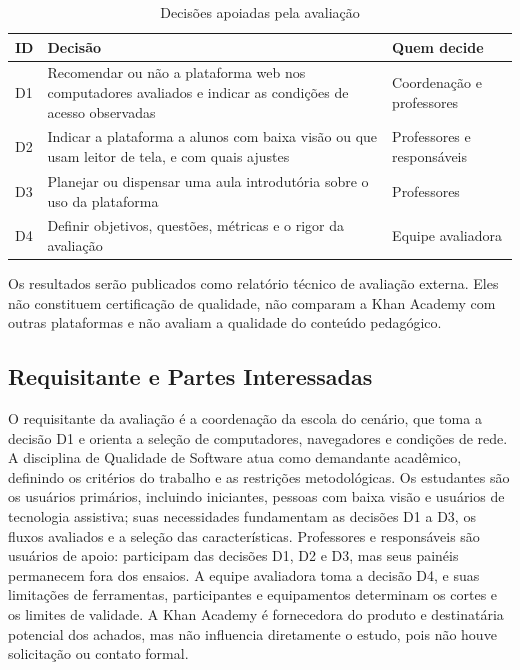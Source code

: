 \documentclass[sigconf, language=english, language=brazilian,natbib=false]{acmart}
\begin{document}
\begin{table}[htbp]
\centering
\caption{Decisões apoiadas pela avaliação}
\label{tab:decisoes}
\scriptsize
\setlength{\tabcolsep}{3pt}
\begin{tabular}{lp{4.3cm}p{2.4cm}}
\hline
\textbf{ID} & \textbf{Decisão} & \textbf{Quem decide} \\
\hline
D1 & Recomendar ou não a plataforma web nos computadores avaliados e indicar as condições de acesso observadas & Coordenação e professores \\
D2 & Indicar a plataforma a alunos com baixa visão ou que usam leitor de tela, e com quais ajustes & Professores e responsáveis \\
D3 & Planejar ou dispensar uma aula introdutória sobre o uso da plataforma & Professores \\
D4 & Definir objetivos, questões, métricas e o rigor da avaliação & Equipe avaliadora \\
\hline
\end{tabular}
\end{table}

Os resultados serão publicados como relatório técnico de avaliação externa. Eles não constituem certificação de qualidade, não comparam a Khan Academy com outras plataformas e não avaliam a qualidade do conteúdo pedagógico.

\subsection{Requisitante e Partes Interessadas}

O requisitante da avaliação é a coordenação da escola do cenário, que toma a decisão D1 e orienta a seleção de computadores, navegadores e condições de rede. A disciplina de Qualidade de Software atua como demandante acadêmico, definindo os critérios do trabalho e as restrições metodológicas. Os estudantes são os usuários primários, incluindo iniciantes, pessoas com baixa visão e usuários de tecnologia assistiva; suas necessidades fundamentam as decisões D1 a D3, os fluxos avaliados e a seleção das características. Professores e responsáveis são usuários de apoio: participam das decisões D1, D2 e D3, mas seus painéis permanecem fora dos ensaios. A equipe avaliadora toma a decisão D4, e suas limitações de ferramentas, participantes e equipamentos determinam os cortes e os limites de validade. A Khan Academy é fornecedora do produto e destinatária potencial dos achados, mas não influencia diretamente o estudo, pois não houve solicitação ou contato formal.
\end{document}
